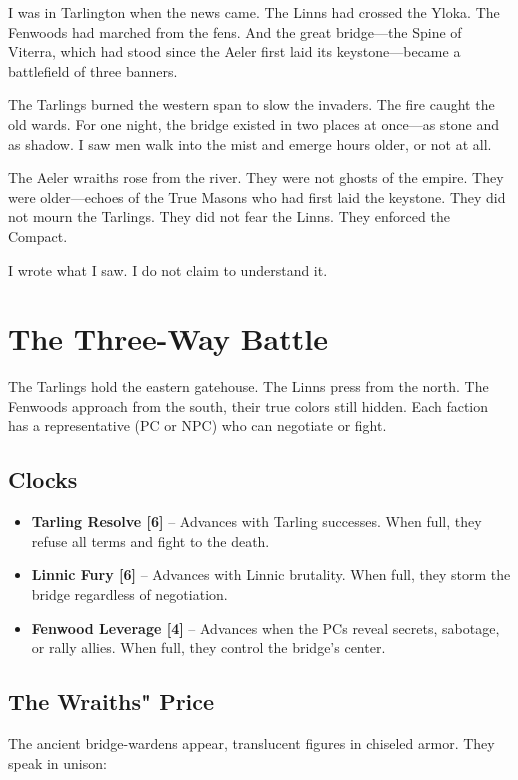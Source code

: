 \documentclass[11pt]{book}
\begin{document}
\lettrine{I}{} was in Tarlington when the news came. The Linns had crossed the Yloka. The Fenwoods had marched from the fens. And the great bridge---the Spine of Viterra, which had stood since the Aeler first laid its keystone---became a battlefield of three banners.

The Tarlings burned the western span to slow the invaders. The fire caught the old wards. For one night, the bridge existed in two places at once---as stone and as shadow. I saw men walk into the mist and emerge hours older, or not at all.

The Aeler wraiths rose from the river. They were not ghosts of the empire. They were older---echoes of the True Masons who had first laid the keystone. They did not mourn the Tarlings. They did not fear the Linns. They enforced the Compact.

I wrote what I saw. I do not claim to understand it.

\section*{The Three-Way Battle}
The Tarlings hold the eastern gatehouse. The Linns press from the north. The Fenwoods approach from the south, their true colors still hidden. Each faction has a representative (PC or NPC) who can negotiate or fight.

\subsection*{Clocks}
\begin{itemize}
    \item \textbf{Tarling Resolve [6]} -- Advances with Tarling successes. When full, they refuse all terms and fight to the death.
    \item \textbf{Linnic Fury [6]} -- Advances with Linnic brutality. When full, they storm the bridge regardless of negotiation.
    \item \textbf{Fenwood Leverage [4]} -- Advances when the PCs reveal secrets, sabotage, or rally allies. When full, they control the bridge's center.
\end{itemize}

\subsection*{The Wraiths" Price}
The ancient bridge-wardens appear, translucent figures in chiseled armor. They speak in unison:
\end{document}
